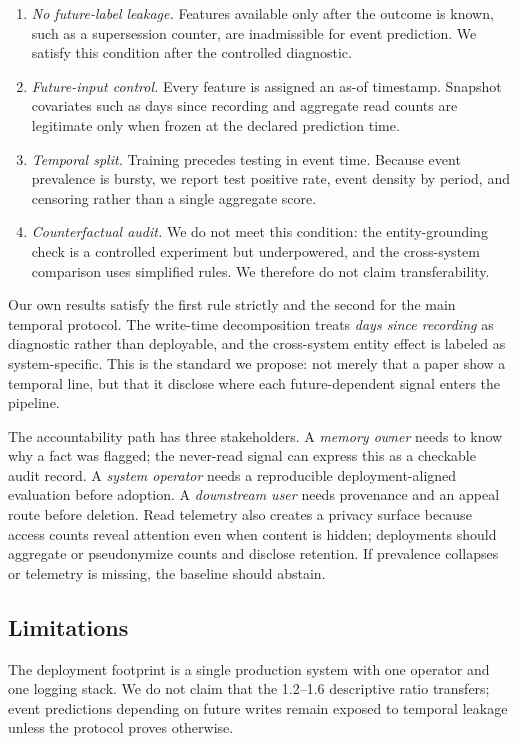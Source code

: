\documentclass[sigconf,nonacm]{acmart}
\begin{document}
\begin{enumerate}
\item \emph{No future-label leakage.} Features available only after the outcome is known, such as a supersession counter, are inadmissible for event prediction. We satisfy this condition after the controlled diagnostic.
\item \emph{Future-input control.} Every feature is assigned an as-of timestamp. Snapshot covariates such as days since recording and aggregate read counts are legitimate only when frozen at the declared prediction time.
\item \emph{Temporal split.} Training precedes testing in event time. Because event prevalence is bursty, we report test positive rate, event density by period, and censoring rather than a single aggregate score.
\item \emph{Counterfactual audit.} We do not meet this condition: the entity-grounding check is a controlled experiment but underpowered, and the cross-system comparison uses simplified rules. We therefore do not claim transferability.
\end{enumerate}

Our own results satisfy the first rule strictly and the second for the main temporal protocol. The write-time decomposition treats \emph{days since recording} as diagnostic rather than deployable, and the cross-system entity effect is labeled as system-specific. This is the standard we propose: not merely that a paper show a temporal line, but that it disclose where each future-dependent signal enters the pipeline.

The accountability path has three stakeholders. A \emph{memory owner} needs to know why a fact was flagged; the never-read signal can express this as a checkable audit record. A \emph{system operator} needs a reproducible deployment-aligned evaluation before adoption. A \emph{downstream user} needs provenance and an appeal route before deletion. Read telemetry also creates a privacy surface because access counts reveal attention even when content is hidden; deployments should aggregate or pseudonymize counts and disclose retention. If prevalence collapses or telemetry is missing, the baseline should abstain.
\subsection{Limitations}
\label{sec:limitations}

The deployment footprint is a single production system with one operator and one logging stack. We do not claim that the 1.2--1.6 descriptive ratio transfers; event predictions depending on future writes remain exposed to temporal leakage unless the protocol proves otherwise.
\end{document}
